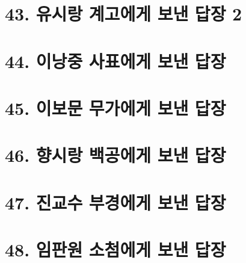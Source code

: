 \documentclass[12pt, a4paper, oneside]{book}
\let\stdsection\section
\renewcommand\section{\newpage\stdsection}
\begin{document}
%
 	\section{43. 유시랑 계고에게 보낸 답장 2 }

%
 	\section{44. 이낭중 사표에게 보낸 답장 }

%
 	\section{45. 이보문 무가에게 보낸 답장 }

%
 	\section{46. 향시랑 백공에게 보낸 답장 }

%
 	\section{47. 진교수 부경에게 보낸 답장 }

%
 	\section{48. 임판원 소첨에게 보낸 답장 }

%
\end{document}
